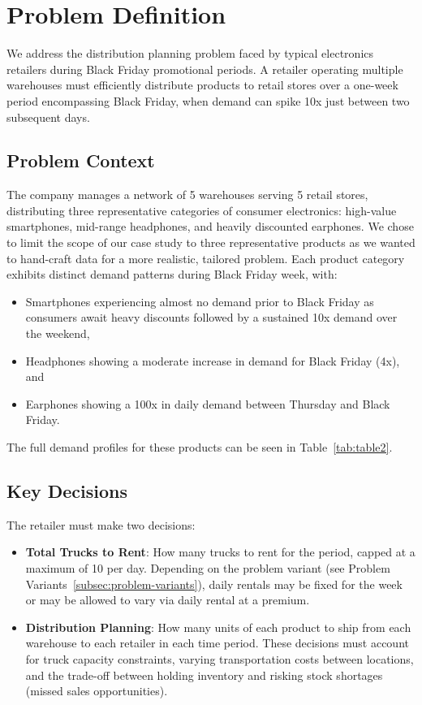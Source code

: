 \documentclass[a4paper,12pt]{article}
\begin{document}
\section{Problem Definition}\label{sec:problem-definition}

We address the distribution planning problem faced by typical electronics retailers during Black Friday promotional periods.
A retailer operating multiple warehouses must efficiently distribute products to retail stores over a one-week period encompassing Black Friday, when demand can spike 10x just between two subsequent days.

\subsection{Problem Context}\label{subsec:problem-context}

The company manages a network of 5 warehouses serving 5 retail stores, distributing three representative categories of consumer electronics: high-value smartphones, mid-range headphones, and heavily discounted earphones.
We chose to limit the scope of our case study to three representative products as we wanted to hand-craft data for a more realistic, tailored problem.
Each product category exhibits distinct demand patterns during Black Friday week, with:

\begin{itemize}
    \item Smartphones experiencing almost no demand prior to Black Friday as consumers await heavy discounts followed by a sustained 10x demand over the weekend,
    \item Headphones showing a moderate increase in demand for Black Friday (4x), and
    \item Earphones showing a 100x in daily demand between Thursday and Black Friday.
\end{itemize}

The full demand profiles for these products can be seen in Table~\ref{tab:table2}.

\subsection{Key Decisions}\label{subsec:key-decisions}

The retailer must make two decisions:
\begin{itemize}
    \item \textbf{Total Trucks to Rent}: How many trucks to rent for the period, capped at a maximum of 10 per day.
Depending on the problem variant (see Problem Variants~\ref{subsec:problem-variants}), daily rentals may be fixed for the week or may be allowed to vary via daily rental at a premium.
    \item \textbf{Distribution Planning}: How many units of each product to ship from each warehouse to each retailer in each time period.
These decisions must account for truck capacity constraints, varying transportation costs between locations, and the trade-off between holding inventory and risking stock shortages (missed sales opportunities).
\end{itemize}
\end{document}
